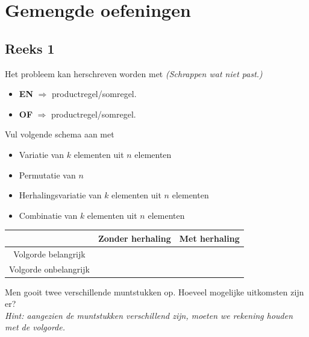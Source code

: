 \documentclass[12pt,twoside]{article}
\begin{document}
\pagebreak
\section{Gemengde oefeningen}

\subsection{Reeks 1}

\begin{oefening}
Het probleem kan herschreven worden met {\em \small (Schrappen wat niet past.)}
\begin{itemize}
  \item {\bf EN} $\Rightarrow$ productregel/somregel.
  \item {\bf OF} $\Rightarrow$ productregel/somregel.
\end{itemize}
\end{oefening}

\begin{oefening}
Vul volgende schema aan met
\begin{itemize}
  \item Variatie van $k$ elementen uit $n$ elementen
  \item Permutatie van $n$
  \item Herhalingsvariatie van $k$ elementen uit $n$ elementen
  \item Combinatie van $k$ elementen uit $n$ elementen
\end{itemize}
\begin{center}
  \begin{tabular}{|c|c|c|}
  \hline
  &     Zonder herhaling & Met herhaling\\
  \hline
  Volgorde belangrijk & \hspace*{4cm} & \hspace*{4cm}\\[2cm]
  \hline
  Volgorde onbelangrijk & &\\[2cm]
  \hline
  \end{tabular}
\end{center}
\end{oefening}

\begin{oefening}
Men gooit twee verschillende muntstukken op. Hoeveel mogelijke uitkomsten zijn er?\\
{\em Hint: aangezien de muntstukken verschillend zijn, moeten we rekening houden met de volgorde.}
\end{oefening}
\end{document}
